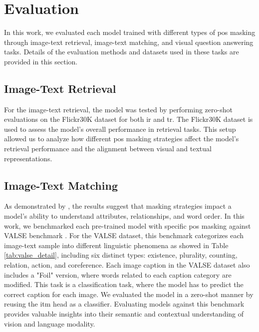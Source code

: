 \section{Evaluation}
In this work, we evaluated each model trained with different types of \acrshort{pos} masking through image-text retrieval, image-text matching, and visual question answering tasks.  
Details of the evaluation methods and datasets used in these tasks are provided in this section.  

\subsection{Image-Text Retrieval}
For the image-text retrieval, the model was tested by performing zero-shot evaluations on the Flickr30K \cite{flickr30k} dataset for both \acrfull{ir} and \acrfull{tr}.  
The Flickr30K dataset is used to assess the model's overall performance in retrieval tasks.
This setup allowed us to analyze how different \acrshort{pos} masking strategies affect the model's retrieval performance and the alignment between visual and textual representations.  

\subsection{Image-Text Matching}
As demonstrated by , the results suggest that masking strategies impact a model’s ability to understand attributes, relationships, and word order.  
In this work, we benchmarked each pre-trained model with specific \acrshort{pos} masking against VALSE benchmark \cite{valse}.  
For the VALSE dataset, this benchmark categorizes each image-text sample into different linguistic phenomena as showed in Table \ref{tab:valse_detail}, including six distinct types: existence, plurality, counting, relation, action, and coreference.  
Each image caption in the VALSE dataset also includes a "Foil" version, where words related to each caption category are modified.  
This task is a classification task, where the model has to predict the correct caption for each image.
We evaluated the model in a zero-shot manner by reusing the \acrshort{itm} head as a classifier.
Evaluating models against this benchmark provides valuable insights into their semantic and contextual understanding of vision and language modality.  

